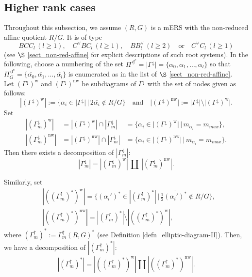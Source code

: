 \documentclass[11pt]{amsart}
\newcommand{\dc}{\,\underline{\mathrm{d}}^c}
\newcommand{\w}{\mathrm{w}}
\newcommand{\nw}{\mathrm{nw}}
\begin{document}
{\subsection{Higher rank cases}
Throughout this subsection, we assume $(R,G)$ is a mERS 
with the non-reduced affine quotient $R/G$.
It is of type
\[BCC_l\, (l\geq 1),\quad C^\vee BC_l\, (l\geq 1),\quad 
BB^\vee _l\, (l\geq 2)\quad\text{or}\quad  C^\vee C_l\, (l\geq 1)\] 
(see $\S$ \ref{sect_non-red-affine} for explicit descriptions of such root systems). 
In the following, choose a numbering of the set
$\Pi^{\dc}=|\Gamma^{\downarrow}|=\{\alpha_0,\alpha_1,\ldots,\alpha_l\}$ 
so that $\Pi^{\dc}_G=\{\overline{\alpha_0},\overline{\alpha_1},\ldots,\overline{\alpha_l}\}$ 
is enumerated as in the list of $\S$ \ref{sect_non-red-affine}. \\

Let $(\Gamma^\downarrow)^\w$\index[notations]{g814@
$(\Gamma^\downarrow)^\w$} and 
$(\Gamma^\downarrow)^\nw$\index[notations]{g815@
$(\Gamma^\downarrow)^\nw$}
be subdiagrams of $\Gamma^{\downarrow}$ with
the set of nodes given as follows:
\[|(\Gamma^\downarrow)^\w|
:=\{\alpha_i\in|\Gamma^{\downarrow}|\,|\,
2\overline{\alpha_i}\not\in R/G\}
\quad\text{and}\quad
|(\Gamma^\downarrow)^\nw|:=|\Gamma^{\downarrow}|\setminus 
|(\Gamma^\downarrow)^\w|.\]
Set
\[\begin{array}{rlllllll}
|(\Gamma^\downarrow_m)^\w|&\!\!\!\!=
|(\Gamma^\downarrow)^\w|\cap|\Gamma_m^{\downarrow}|
&\!\!\!\! =\big\{\alpha_i\in \vert (\Gamma^\downarrow)^\w\vert \,\big|\,
m_{\alpha_i}=m_{max}\big\},\\[3pt]
|(\Gamma^\downarrow_m)^\nw|
&\!\!\!\!=|(\Gamma^\downarrow)^\nw| \cap|\Gamma_m^{\downarrow}|
&\!\!\!\!=\big\{\alpha_i\in \vert (\Gamma^\downarrow)^\nw \vert\,
\big|\,m_{\alpha_i}=m_{max}\big\}.
\end{array}\]
Then there exists a decomposition of $|\Gamma_m^{\downarrow}|$:
\[|\Gamma_m^{\downarrow}|=
|(\Gamma^\downarrow_m)^\w|\, \amalg\, 
|(\Gamma^\downarrow_m)^\nw|.\]

Similarly, set
\begin{align*}
&|((\Gamma^\uparrow_m)^\ast)^\w|
=\big\{(\alpha_i')^\ast\in|(\Gamma^\uparrow_m)^\ast|\,\big|\,
\tfrac12\overline{(\alpha_i')^\ast}\not\in R/G \big\}, \\
&
|((\Gamma^\uparrow_m)^\ast)^\nw|=|(\Gamma^\uparrow_m)^\ast|\setminus 
|((\Gamma^\uparrow_m)^\ast)^\w|,
\end{align*}
where $(\Gamma^\uparrow_m)^\ast:=\Gamma_m^\uparrow(R,G)^\ast$ 
(see Definition \ref{defn_elliptic-diagram-II}). Then, we have a decomposition of
$|(\Gamma^\uparrow_m)^\ast|$:
\begin{equation}\label{eq:decomp-upstair-1}
|(\Gamma^\uparrow_m)^\ast|=|((\Gamma^\uparrow_m)^\ast)^\w|\amalg
|((\Gamma^\uparrow_m)^\ast)^\nw|.
\end{equation}

}
\end{document}
